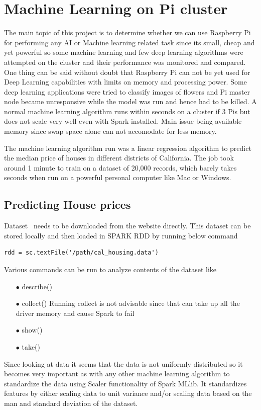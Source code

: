 \section{Machine Learning on Pi cluster}
The main topic of this project is to determine whether we can use Raspberry Pi for performing any AI or Machine learning related task since its small, cheap and yet powerful so some machine learning and few deep learning algorithms were attempted on the cluster and their performance was monitored and compared. One thing can be said without doubt that Raspberry Pi can not be yet used for Deep Learning capabilities with limits on memory and processing power. Some deep learning applications were tried to classify images of flowers and Pi master node became unresponsive while the model was run and hence had to be killed. A normal machine learning algorithm runs within seconds on a cluster if 3 Pis but does not scale very well even with Spark installed. Main issue being available memory since swap space alone can not accomodate for less memory. 

The machine learning algorithm run was a linear regression algorithm to predict the median price of houses in different districts of California. The job took around 1 minute to train on a dataset of 20,000 records, which barely takes seconds when run on a powerful personal computer like Mac or Windows.

\subsection{Predicting House prices }   
Dataset~\cite{hid-sp18-510-dataset} needs to be downloaded from the website directly. This dataset can be stored locally and then loaded in SPARK RDD by running below command
\begin{verbatim}
rdd = sc.textFile('/path/cal_housing.data')
\end{verbatim} 
Various commands can be run to analyze contents of the dataset like 
\begin{itemize}
\item[$\bullet$] describe()
\item[$\bullet$] collect() Running collect is not advisable since that can take up all the driver memory and cause Spark to fail
\item[$\bullet$] show()
\item[$\bullet$] take()
\end{itemize}

Since looking at data it seems that the data is not uniformly distributed so it becomes very important as with any other machine learning algorithm to standardize the data using Scaler functionality of Spark MLlib. It standardizes features by either scaling data to unit variance and/or scaling data based on the man and standard deviation of the dataset. 

